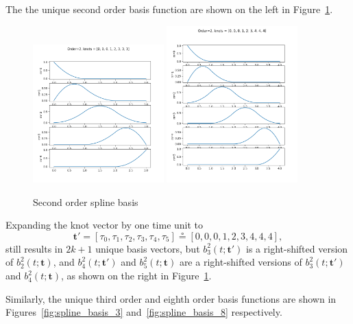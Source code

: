 \documentclass{article}
\newcommand{\defeq}{\circeq}
\begin{document}
The the unique second order basis function are shown on the left in Figure~\ref{fig:spline_basis_2}.
\begin{figure}[hbt]
  \centering
  	\includegraphics[width=0.45\textwidth]{./figures/spline_basis_2}
  	\includegraphics[width=0.45\textwidth]{./figures/spline_basis_2_extra_knot}
  \caption{Second order spline basis}
  \label{fig:spline_basis_2}  
\end{figure}
Expanding the knot vector by one time unit to 
\[
\mathbf{t}' = [\tau_0, \tau_1, \tau_2, \tau_3, \tau_4, \tau_5] \defeq [0, 0, 0, 1, 2, 3, 4, 4, 4],
\]
still results in $2k+1$ unique basis vectors, but $b_3^2(t; \mathbf{t}')$ is a right-shifted version of $b_2^2(t; \mathbf{t})$, and $b_4^2(t; \mathbf{t}')$ and $b_5^2(t; \mathbf{t})$ are a right-shifted versions of $b_3^2(t; \mathbf{t}')$ and $b_4^2(t; \mathbf{t})$, as shown on the right in Figure~\ref{fig:spline_basis_2}.

Similarly, the unique third order and eighth order basis functions are shown in Figures~\ref{fig:spline_basis_3} and~\ref{fig:spline_basis_8} respectively.
\end{document}
